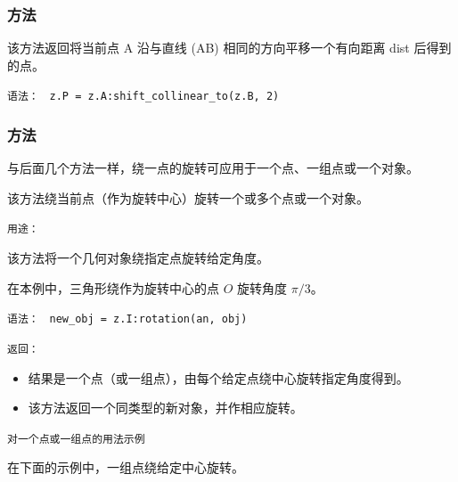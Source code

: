 \subsubsection{方法 }
\label{shift_collinear}
该方法返回将当前点 A 沿与直线 (AB) 相同的方向平移一个有向距离 dist 后得到的点。

\medskip
\texttt{语法： } \verb|z.P = z.A:shift_collinear_to(z.B, 2)|



\subsubsection{方法 }
\label{ssub:object_rotation}

与后面几个方法一样，绕一点的旋转可应用于一个点、一组点或一个对象。

该方法绕当前点（作为旋转中心）旋转一个或多个点或一个对象。


\medskip
\texttt{用途：}

该方法将一个几何对象绕指定点旋转给定角度。

在本例中，三角形绕作为旋转中心的点 $O$ 旋转角度 $\pi/3$。


\medskip
\texttt{语法： } \verb|new_obj = z.I:rotation(an, obj)|


\medskip
\texttt{返回：}
\begin{itemize}
\item 结果是一个点（或一组点），由每个给定点绕中心旋转指定角度得到。
\item 该方法返回一个同类型的新对象，并作相应旋转。
\end{itemize}


\medskip
\texttt{对一个点或一组点的用法示例}

在下面的示例中，一组点绕给定中心旋转。

\vspace{1em}

\begin{tkzexample}[latex=7cm]
\begin{center}
\end{center}
\end{tkzexample}

